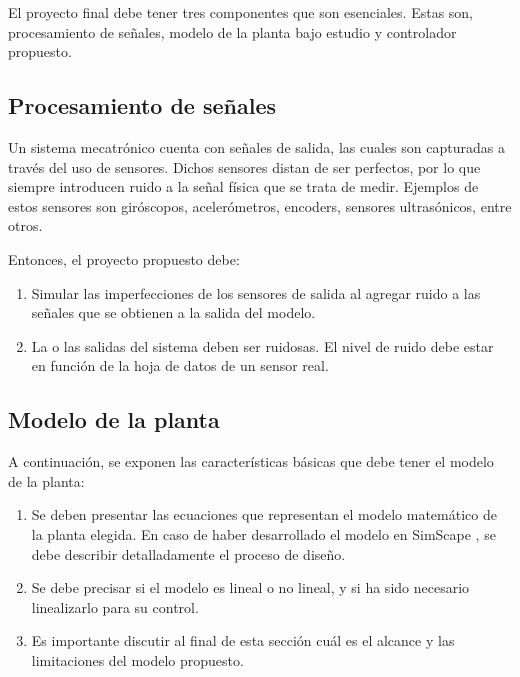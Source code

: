 \documentclass{article}
\begin{document}
El proyecto final debe tener tres componentes que son esenciales. Estas son, procesamiento de señales, modelo de la planta bajo estudio y controlador propuesto.

\subsection{Procesamiento de señales}
\label{sec:dsp}

Un sistema mecatrónico cuenta con señales de salida, las cuales son capturadas a través del uso de sensores. Dichos sensores distan de ser perfectos, por lo que siempre introducen ruido a la señal física que se trata de medir. Ejemplos de estos sensores son giróscopos, acelerómetros, encoders, sensores ultrasónicos, entre otros.

Entonces, el proyecto propuesto debe:

\begin{enumerate}

    \item Simular las imperfecciones de los sensores de salida al agregar ruido a las señales que se obtienen a la salida del modelo. 
    
    \item La o las salidas del sistema deben ser ruidosas. El nivel de ruido debe estar en función de la hoja de datos de un sensor real. 
\end{enumerate}

\subsection{Modelo de la planta}
\label{sec:modelo}

A continuación, se exponen las características básicas que debe tener el modelo de la planta:

\begin{enumerate}

    \item Se deben presentar las ecuaciones que representan el modelo matemático de la planta elegida. En caso de haber desarrollado el modelo en SimScape \cite{Simscape2019}, se debe describir detalladamente el proceso de diseño. 
    
    \item Se debe precisar si el modelo es lineal o no lineal, y si ha sido necesario linealizarlo para su control.
    
    \item Es importante discutir al final de esta sección cuál es el alcance y las limitaciones del modelo propuesto.

\end{enumerate}
\end{document}
